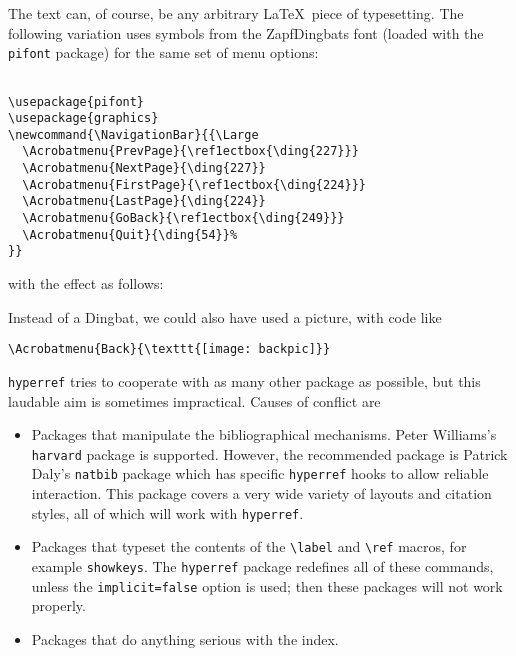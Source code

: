  
The text can, of course, be any arbitrary \LaTeX\  piece of typesetting.
The following variation uses symbols from the ZapfDingbats font (loaded
with the \verb|pifont| package) for the same set of menu options: 

\begin{verbatim}

\usepackage{pifont} 
\usepackage{graphics} 
\newcommand{\NavigationBar}{{\Large 
  \Acrobatmenu{PrevPage}{\ref1ectbox{\ding{227}}} 
  \Acrobatmenu{NextPage}{\ding{227}} 
  \Acrobatmenu{FirstPage}{\ref1ectbox{\ding{224}}} 
  \Acrobatmenu{LastPage}{\ding{224}} 
  \Acrobatmenu{GoBack}{\ref1ectbox{\ding{249}}} 
  \Acrobatmenu{Quit}{\ding{54}}% 
}} 

\end{verbatim}

with the effect as follows: 

Instead of a Dingbat, we could also have used a picture, with code like 

\begin{verbatim}
\Acrobatmenu{Back}{\texttt{[image: backpic]}} 
\end{verbatim}


\verb|hyperref| tries to cooperate with as many other package as possible, but
this laudable aim is sometimes impractical. Causes of conflict are 

\begin{itemize}

  \item Packages that manipulate the bibliographical mechanisms. Peter Williams's 
    \verb|harvard| package is supported. However, the recommended package is Patrick 
    Daly's \verb|natbib| package which has specific \verb|hyperref| hooks to allow reliable interaction. This package covers a very wide variety of layouts and citation styles, 
    all of which will work with \verb|hyperref|. 

  \item Packages that typeset the contents of the \verb|\label| and
    \verb|\ref| macros, for example \verb|showkeys|. The \verb|hyperref| package
    redefines all of these commands, unless the \verb|implicit=false| option is
    used; then these packages will not work properly. 

  \item Packages that do anything serious with the index. 

\end{itemize}

